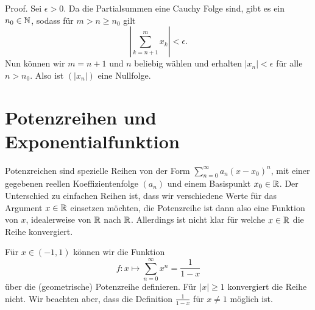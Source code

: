 \begin{emphBox}{}{}
Proof.  Sei \(\epsilon >0 \). Da die Partialsummen eine Cauchy Folge sind, gibt es ein \(n_0 \in \mathbb{N}\), sodass für \(m>n\geq n_0\) gilt
\begin{equation*}
|\sum_{k=n+1}^m x_k| < \epsilon.
\end{equation*}
Nun können wir \(m=n+1\) und \(n\) beliebig wählen und erhalten \(|x_n|<\epsilon\) für alle \(n > n_0\). Also ist \((|x_n|)\)
eine Nullfolge.
\end{emphBox}


\section{Potenzreihen und Exponentialfunktion}
\label{\detokenize{metrik/potenzreihen:potenzreihen-und-exponentialfunktion}}\label{\detokenize{metrik/potenzreihen::doc}}
Potenzreichen sind spezielle Reihen von der Form \(\sum_{n=0}^\infty a_n (x-x_0)^n\), mit einer gegebenen reellen Koeffizientenfolge \((a_n)\) und einem Basispunkt \(x_0 \in \mathbb{R}\). Der Unterschied zu einfachen Reihen ist, dass wir verschiedene Werte für das Argument \(x\in \mathbb{R}\) einsetzen möchten, die Potenzreihe ist dann also eine Funktion von \(x\), idealerweise von \(\mathbb{R}\) nach \(\mathbb{R}\). Allerdings ist nicht klar für welche \(x \in \mathbb{R}\) die Reihe konvergiert.
\label{metrik/potenzreihen:example-0}
\begin{example}{}{}



Für \(x \in (-1,1)\) können wir die Funktion
\begin{equation*}
 f: x \mapsto \sum_{n=0}^\infty x^n = \frac{1}{1-x}
\end{equation*}
über die (geometrische) Potenzreihe definieren. Für \(|x| \geq 1\) konvergiert die Reihe nicht. Wir beachten aber, dass die Definition \(\frac{1}{1-x}\) für \(x\neq 1\) möglich ist.
\end{example}

